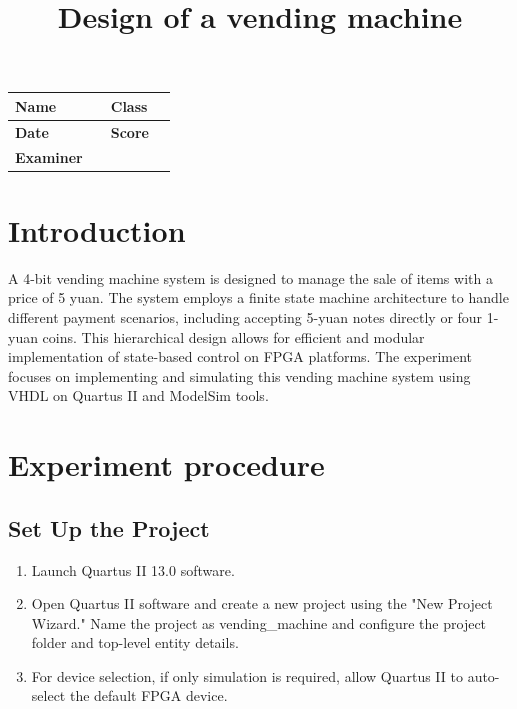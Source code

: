 \documentclass[]{article}
\begin{document}
\title{\huge Design of a vending machine}
\author{\large }
\date{}

\maketitle

\vspace{3cm}

\begin{center}
    {\large
        \begin{tabular}{|p{2.5cm}|p{3.5cm}|p{2.5cm}|p{3.5cm}|}
            \hline
            \textbf{Name}     &  & \textbf{Class} &       \\[0.8cm]
            \hline
            \textbf{Date}     &  & \textbf{Score} & \quad \\[0.8cm]
            \hline
            \textbf{Examiner} &  & \quad          & \quad \\[0.8cm]
            \hline
        \end{tabular}
    }
\end{center}

\newpage
\tableofcontents
\newpage
\newpage

\section{Introduction}
A 4-bit vending machine system is designed to manage the sale of items with a price of 5 yuan. The system employs a finite state machine architecture to handle different payment scenarios, including accepting 5-yuan notes directly or four 1-yuan coins. This hierarchical design allows for efficient and modular implementation of state-based control on FPGA platforms. The experiment focuses on implementing and simulating this vending machine system using VHDL on Quartus II and ModelSim tools.

\section{Experiment procedure}

\subsection{Set Up the Project}

\begin{enumerate}[label = (\arabic*)]
    \item Launch Quartus II 13.0 software.
    \item Open Quartus II software and create a new project using the "New Project Wizard." Name the project as vending\_machine and configure the project folder and top-level entity details.
    \item For device selection, if only simulation is required, allow Quartus II to auto-select the default FPGA device.

\end{enumerate}
\end{document}
